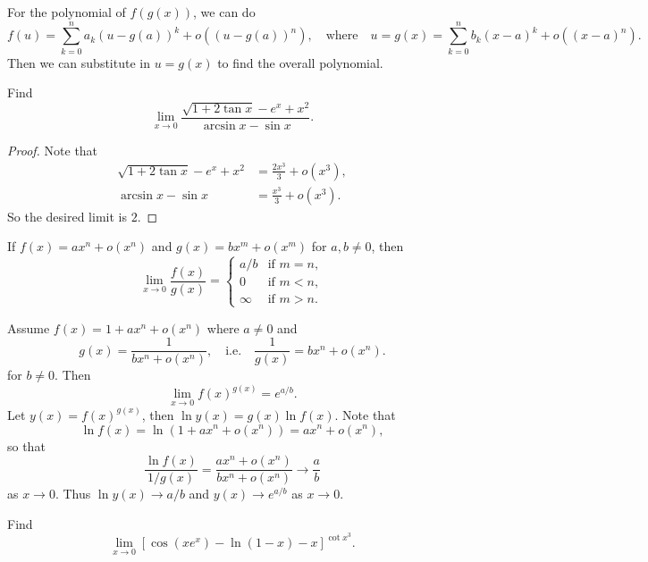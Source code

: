 \begin{remark}
  For the polynomial of $f(g(x))$, we can do
  \[
    f(u) = \sum_{k = 0}^n a_k (u - g(a))^k + o((u - g(a))^n),
    \quad \text{where} \quad
    u = g(x) = \sum_{k = 0}^n b_k(x - a)^k + o((x - a)^n).
  \]
  Then we can substitute  in $u = g(x)$ to find the
  overall polynomial.
\end{remark}

\begin{example}
  Find
  \[
    \lim_{x \to 0} \frac{\sqrt{1 + 2 \tan x} - e^x + x^2}{\arcsin x - \sin x}.
  \]
\end{example}

\begin{proof}
  Note that
  \begin{align*}
    \sqrt{1 + 2\tan x} - e^x + x^2 &= \frac{2x^3}{3} + o(x^3), \\
    \arcsin x - \sin x &= \frac{x^3}{3} + o(x^3).
  \end{align*}
  So the desired limit is $2$.
\end{proof}

\begin{remark}
  If $f(x) = ax^n + o(x^n)$ and $g(x) = bx^m + o(x^m)$
  for $a, b \ne 0$, then
  \[
    \lim_{x \to 0} \frac{f(x)}{g(x)} = \begin{cases}
      a / b & \text{if $m = n$}, \\
      0 & \text{if $m < n$}, \\
      \infty & \text{if $m > n$}.
    \end{cases}
  \]
\end{remark}

\begin{example}
  Assume $f(x) = 1 + ax^n + o(x^n)$ where
  $a \ne 0$ and
  \[
    g(x) = \frac{1}{bx^n + o(x^n)}, \quad \text{i.e.} \quad
    \frac{1}{g(x)} = bx^n + o(x^n).
  \]
  for $b \ne 0$. Then
  \[
    \lim_{x \to 0} f(x)^{g(x)} = e^{a / b}.
  \]
  Let $y(x) = f(x)^{g(x)}$, then
  $\ln y(x) = g(x) \ln f(x)$. Note that
  \[
    \ln f(x) = \ln(1 + ax^n + o(x^n))
    = ax^n + o(x^n),
  \]
  so that
  \[
    \frac{\ln f(x)}{1 / g(x)} = \frac{ax^n + o(x^n)}{bx^n + o(x^n)} \to \frac{a}{b}
  \]
  as $x \to 0$. Thus $\ln y(x) \to a / b$ and
  $y(x) \to e^{a / b}$ as $x \to 0$.
\end{example}

\begin{example}
  Find
  \[
    \lim_{x \to 0} \left[\cos(xe^x) - \ln (1 - x) - x\right]^{\cot x^3}.
  \]
\end{example}

